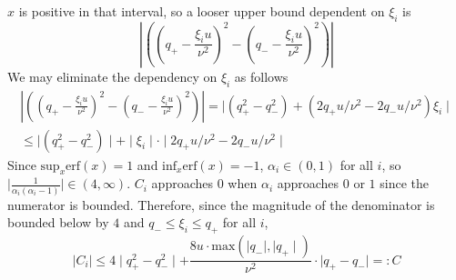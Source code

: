         $x$ is positive in that interval, so a looser upper bound dependent on $\xi_i$ is
        \begin{equation*}
\left\lvert \left(\left(q_+-\frac{\xi_i u}{\nu^2}\right)^2 - \left(q_--\frac{\xi_i u}{\nu^2}\right)^2\right)  \right\rvert 
        \end{equation*}
        We may eliminate the dependency on $\xi_i$ as follows
        \begin{align*}
             \left\lvert \left(\left(q_+-\frac{\xi_i u}{\nu^2}\right)^2 - \left(q_--\frac{\xi_i u}{\nu^2}\right)^2\right)  \right\rvert = \mid (q_+^2 - q_-^2) + (2q_+u/\nu^2 - 2q_-u/\nu^2)\xi_i\mid \\
             \leq \mid (q_+^2 - q_-^2)\mid + \mid \xi_i \mid \cdot \mid  2q_+u/\nu^2 - 2q_-u/\nu^2\mid
        \end{align*}
        Since $\text{sup}_x \text{erf}(x) = 1$ and $\text{inf}_x \text{erf}(x) = -1$, $\alpha_i \in (0,1)$ for all $i$, so $\mid \frac{1}{\alpha_i(\alpha_i -1)}\mid \in (4,\infty)$. $C_i$ approaches $0$ when $\alpha_i$ approaches $0$ or $1$ since the numerator is bounded. Therefore, since the magnitude of the denominator is bounded below by $4$ and $q_- \leq \xi_i \leq q_+$ for all $i$,
        \begin{equation*}
            \mid C_i \mid \leq 4\mid q_+^2 - q_-^2\mid + \frac{8u \cdot \text{max}(\mid q_-\mid, \mid q_+\mid)}{\nu^2} \cdot  \mid q_+ - q_-\mid =: C
        \end{equation*}


        

